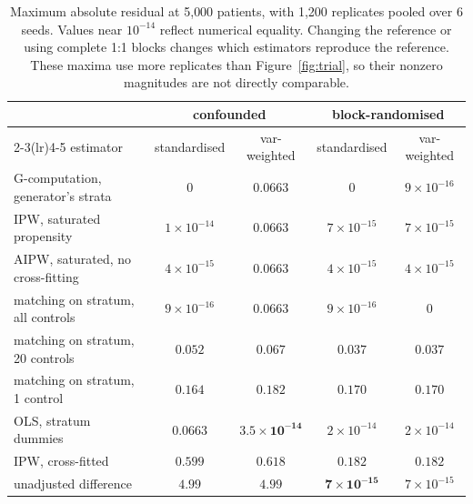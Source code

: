 \begin{table}[htbp]
\small
\centering
\caption{Maximum absolute residual at 5{,}000 patients, with 1{,}200 replicates
pooled over 6 seeds. Values near $10^{-14}$ reflect numerical equality.
Changing the reference or using complete 1:1 blocks changes which estimators
reproduce the reference. These maxima use more replicates than
Figure~\ref{fig:trial}, so their nonzero magnitudes are not directly comparable.}
\label{tab:matrix}
\begin{tabular}{@{}lcccc@{}}
\toprule
& \multicolumn{2}{c}{\textbf{confounded}} & \multicolumn{2}{c}{\textbf{block-randomised}} \\
\cmidrule(lr){2-3}\cmidrule(lr){4-5}
estimator & standardised & var-weighted & standardised & var-weighted \\
\midrule
G-computation, generator's strata & $0$          & $0.0663$     & $0$          & $9\!\times\!10^{-16}$ \\
IPW, saturated propensity         & $1\!\times\!10^{-14}$ & $0.0663$ & $7\!\times\!10^{-15}$ & $7\!\times\!10^{-15}$ \\
AIPW, saturated, no cross-fitting & $4\!\times\!10^{-15}$ & $0.0663$ & $4\!\times\!10^{-15}$ & $4\!\times\!10^{-15}$ \\
matching on stratum, all controls & $9\!\times\!10^{-16}$ & $0.0663$ & $9\!\times\!10^{-16}$ & $0$ \\
matching on stratum, 20 controls  & $0.052$      & $0.067$      & $0.037$      & $0.037$ \\
matching on stratum, 1 control    & $0.164$      & $0.182$      & $0.170$      & $0.170$ \\
OLS, stratum dummies              & $0.0663$     & $\mathbf{3.5\!\times\!10^{-14}}$ & $2\!\times\!10^{-14}$ & $2\!\times\!10^{-14}$ \\
IPW, cross-fitted                 & $0.599$      & $0.618$      & $0.182$      & $0.182$ \\
unadjusted difference             & $4.99$       & $4.99$       & $\mathbf{7\!\times\!10^{-15}}$ & $7\!\times\!10^{-15}$ \\
\bottomrule
\end{tabular}
\end{table}

